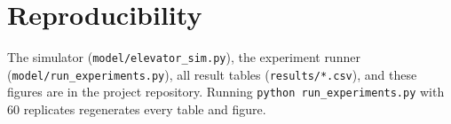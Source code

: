 \section{Reproducibility}
\label{sec:repro}

The simulator (\texttt{model/elevator\_sim.py}), the experiment runner (\texttt{model/run\_experiments.py}),
all result tables (\texttt{results/*.csv}), and these figures are in the project repository. Running
\texttt{python run\_experiments.py} with 60 replicates regenerates every table and figure.
